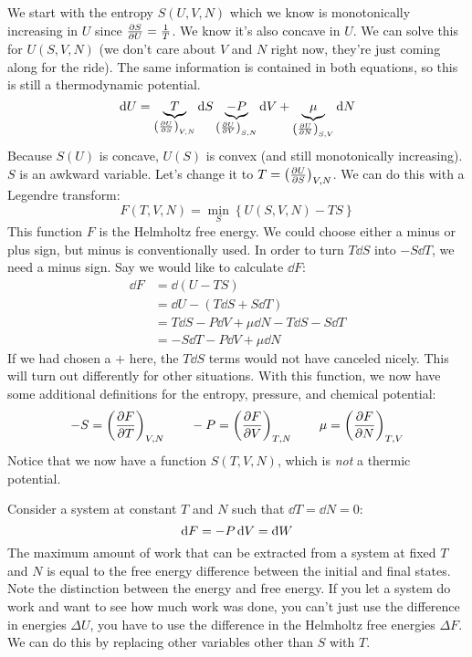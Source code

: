 \documentclass[a4paper,twoside,master.tex]{subfiles}
\begin{document}
We start with the entropy $ S(U,V,N) $ which we know is monotonically increasing in $ U $ since $ \pdv{S}{U} = \frac{1}{T} $. We know it's also concave in $ U $. We can solve this for $ U(S,V,N) $ (we don't care about $ V $ and $ N $ right now, they're just coming along for the ride). The same information is contained in both equations, so this is still a thermodynamic potential.
\begin{equation}
    \dd{U} = \underbrace{T}_{\left( \pdv{U}{S} \right)_{V,N}} \dd{S} \underbrace{- P}_{\left( \pdv{U}{V} \right)_{S,N}} \dd{V} + \underbrace{\mu}_{\left( \pdv{U}{N} \right)_{S,V}} \dd{N}
\end{equation}
Because $ S(U) $ is concave, $ U(S) $ is convex (and still monotonically increasing). $ S $ is an awkward variable. Let's change it to $ T = \left( \pdv{U}{S} \right)_{V,N} $. We can do this with a Legendre transform:
\begin{equation}\label{eq:helmholtz_free_energy}
    F(T,V,N) = \min_S \left\{ U(S,V,N) - TS \right\}\tag{Helmholtz Free Energy}
\end{equation}
This function $ F $ is the Helmholtz free energy. We could choose either a minus or plus sign, but minus is conventionally used. In order to turn $ T \dd{S} $ into $ -S \dd{T} $, we need a minus sign. Say we would like to calculate $ \dd{F} $:
\begin{align}
    \dd{F} &= \dd{\left( U-TS \right)} \\
    &= \dd{U} - \left( T \dd{S} + S \dd{T} \right) \\
    &= T \dd{S} - P \dd{V} + \mu \dd{N} - T \dd{S} - S \dd{T} \\
    &= - S \dd{T} - P \dd{V} + \mu \dd{N}
\end{align}
If we had chosen a $ + $ here, the $ T \dd{S} $ terms would not have canceled nicely. This will turn out differently for other situations. With this function, we now have some additional definitions for the entropy, pressure, and chemical potential:
\begin{equation}
    -S = \left( \pdv{F}{T} \right)_{V,N} \qquad -P = \left( \pdv{F}{V} \right)_{T,N} \qquad \mu = \left( \pdv{F}{N} \right)_{T,V}
\end{equation}
Notice that we now have a function $ S(T,V,N) $, which is \textit{not} a thermic potential.

Consider a system at constant $ T $ and $ N $ such that $ \dd{T} = \dd{N} = 0 $:
\begin{equation}
    \dd{F} = -P \dd{V} = \dbar{W}
\end{equation}
The maximum amount of work that can be extracted from a system at fixed $ T $ and $ N $ is equal to the free energy difference between the initial and final states. Note the distinction between the energy and free energy. If you let a system do work and want to see how much work was done, you can't just use the difference in energies $ \Delta U $, you have to use the difference in the Helmholtz free energies $ \Delta F $. We can do this by replacing other variables other than $ S $ with $ T $.
\end{document}
